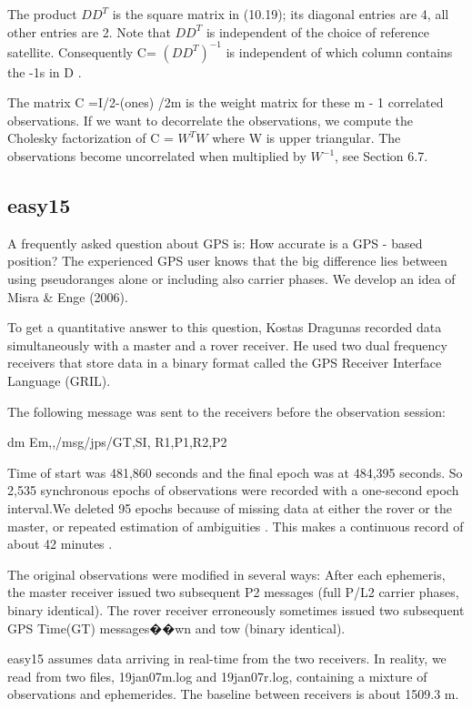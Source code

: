 The product $DD^{T}$ is the square matrix in (10.19); its diagonal entries are 4, all other entries are 2. Note that $DD^{T}$ is independent of the choice of reference satellite. Consequently C= $(DD^{T})^{-1}$ is independent of which column contains the -1s in D .

The matrix C =I/2-(ones) /2m is the weight matrix for these m - 1 correlated observations. If we want to decorrelate the observations, we compute the Cholesky factorization of C = $W^{T}W$ where W is upper triangular. The observations become uncorrelated when multiplied by $W^{-1}$, see Section 6.7.

\subsection{easy15}

A frequently asked question about GPS is: How accurate is a GPS - based position? The experienced GPS user knows that the big difference lies between using pseudoranges alone or including also carrier phases. We develop an idea of Misra \& Enge (2006).

To get a quantitative answer to this question, Kostas Dragunas recorded data simultaneously with a master and a rover receiver. He used two dual frequency receivers that store data in a binary format called the GPS Receiver Interface Language (GRIL).

The following message was sent to the receivers before the observation session:

dm
Em,,/msg/jps/GT,SI, R1,P1,R2,P2

Time of start was 481,860 seconds and the final epoch was at 484,395 seconds. So 2,535 synchronous epochs of observations were recorded with a one-second epoch interval.We deleted 95 epochs because of missing data at either the rover or the master, or repeated estimation of ambiguities . This makes a continuous record of about 42 minutes .

The original observations were modified in several ways: After each ephemeris, the master receiver issued two subsequent P2 messages (full P/L2 carrier phases, binary identical). The rover receiver erroneously sometimes issued two subsequent GPS Time(GT) messages��wn and tow (binary identical).

easy15 assumes data arriving in real-time from the two receivers. In reality, we read from two files, 19jan07m.log and 19jan07r.log, containing a mixture of observations and ephemerides. The baseline between receivers is about 1509.3 m.

